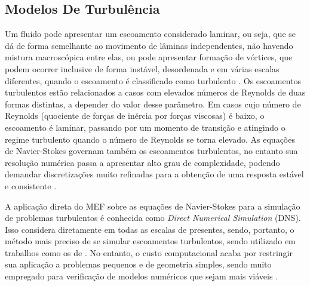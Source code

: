 \subsection{Modelos De Turbulência} \label{MT}

Um fluido pode apresentar um escoamento considerado laminar, ou seja, que se dá de forma semelhante ao movimento de lâminas independentes, não havendo mistura macroscópica entre elas, ou pode apresentar formação de vórtices, que podem ocorrer inclusive de forma instável, desordenada e em várias escalas diferentes, quando o escoamento é classificado como turbulento \cite{popiolek2005analise,shaughnessy2005introduction}. Os escoamentos turbulentos estão relacionados a casos com elevados números de Reynolds de duas formas distintas, a depender do valor desse parâmetro. Em casos cujo número de Reynolds (quociente de forças de inércia por forças viscosas) é baixo, o escoamento é laminar, passando por um momento de transição e atingindo o regime turbulento quando o número de Reynolds se torna elevado. As equações de Navier-Stokes governam também os escoamentos turbulentos, no entanto sua resolução numérica passa a apresentar alto grau de complexidade, podendo demandar discretizações muito refinadas para a obtenção de uma resposta estável e consistente \cite{neto2002fundamentos}.

A aplicação direta do MEF sobre as equações de Navier-Stokes para a simulação de problemas turbulentos é conhecida como \textit{Direct Numerical Simulation} (DNS). Isso considera diretamente em todas as escalas de presentes, sendo, portanto, o método mais preciso de se simular escoamentos turbulentos, sendo utilizado em trabalhos como os de . No entanto, o custo computacional acaba por restringir sua aplicação a problemas pequenos e de geometria simples, sendo muito empregado para verificação de modelos numéricos que sejam mais viáveis \cite{piomelli1999large,yokokawa200216}.

